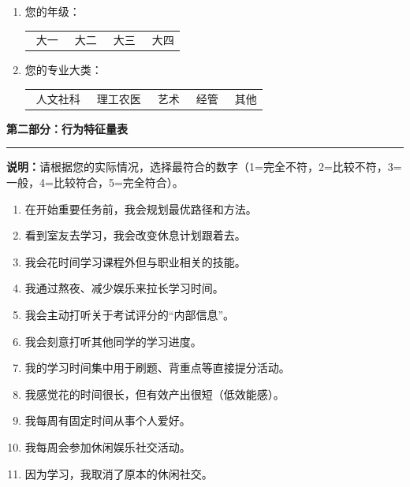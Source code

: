 \documentclass[win,thesis]{hustreport} %
\begin{document}
\begin{appendixblock}
\begin{enumerate}[label=\textbf{Q\arabic*.}, leftmargin=3em, itemsep=0.8em]
			\item 您的年级：\\
			\begin{tabular}{llll}
				\radio\ 大一 & \radio\ 大二 & \radio\ 大三 & \radio\ 大四
			\end{tabular}
			
			\item 您的专业大类：\\
			\begin{tabular}{lllll}
				\radio\ 人文社科 & \radio\ 理工农医 & \radio\ 艺术 & \radio\ 经管 & \radio\ 其他
			\end{tabular}
		\end{enumerate}
		
		\vspace{1.5em}
		
		\noindent\textbf{\large 第二部分：行为特征量表}
		\hrule \vspace{0.5em}
		\noindent\small{\textbf{说明：}请根据您的实际情况，选择最符合的数字（1=完全不符，2=比较不符，3=一般，4=比较符合，5=完全符合）。}
		
		\begin{enumerate}[label=\textbf{Q\arabic*.}, start=4, leftmargin=3em, itemsep=0.5em]
			\item 在开始重要任务前，我会规划最优路径和方法。 \dotfill [ 1  2  3  4  5 ]
			\item 看到室友去学习，我会改变休息计划跟着去。 \dotfill [ 1  2  3  4  5 ]
			\item 我会花时间学习课程外但与职业相关的技能。 \dotfill [ 1  2  3  4  5 ]
			\item 我通过熬夜、减少娱乐来拉长学习时间。 \dotfill [ 1  2  3  4  5 ]
			\item 我会主动打听关于考试评分的“内部信息”。 \dotfill [ 1  2  3  4  5 ]
			\item 我会刻意打听其他同学的学习进度。 \dotfill [ 1  2  3  4  5 ]
			\item 我的学习时间集中用于刷题、背重点等直接提分活动。 \dotfill [ 1  2  3  4  5 ]
			\item 我感觉花的时间很长，但有效产出很短（低效能感）。 \dotfill [ 1  2  3  4  5 ]
			\item 我每周有固定时间从事个人爱好。 \dotfill [ 1  2  3  4  5 ]
			\item 我每周会参加休闲娱乐社交活动。 \dotfill [ 1  2  3  4  5 ]
			\item 因为学习，我取消了原本的休闲社交。 \dotfill [ 1  2  3  4  5 ]
		\end{enumerate}
		

\end{appendixblock}
\end{document}

